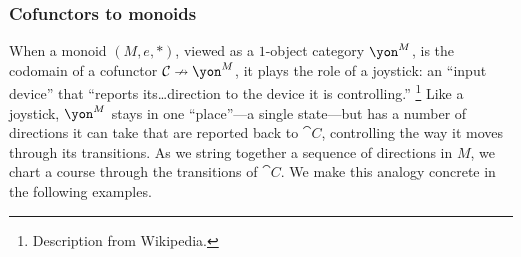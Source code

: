 \documentclass[Book-Poly]{subfiles}
\begin{document}
\subsubsection{Cofunctors to monoids}

When a monoid $(M,e,*)$, viewed as a $1$-object category $\yon^M$, is the codomain of a cofunctor $\cat{C}\cof\yon^M$, it plays the role of a joystick: an ``input device'' that ``reports its\dots direction to the device it is controlling.''%
\footnote{Description from Wikipedia.} %
Like a joystick, $\yon^M$ stays in one ``place''---a single state---but has a number of directions it can take that are reported back to $\cat{C}$, controlling the way it moves through its transitions.
As we string together a sequence of directions in $M$, we chart a course through the transitions of $\cat C$.
We make this analogy concrete in the following examples.
\end{document}
